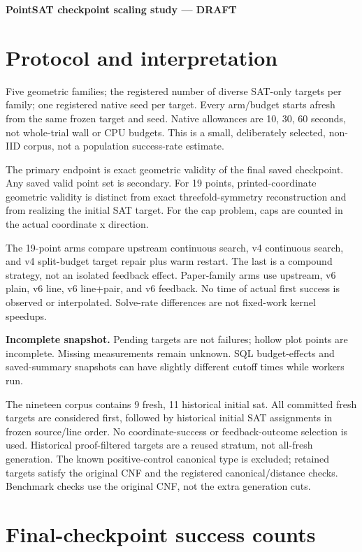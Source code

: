 \documentclass[10pt,a4paper]{article}
\begin{document}
\begin{center}{\Large\bfseries PointSAT checkpoint scaling study --- DRAFT}\end{center}

\section*{Protocol and interpretation}

Five geometric families; the registered number of diverse SAT-only targets per family; one registered native seed per target. Every arm/budget starts afresh from the same frozen target and seed. Native allowances are 10, 30, 60 seconds, not whole-trial wall or CPU budgets. This is a small, deliberately selected, non-IID corpus, not a population success-rate estimate.

The primary endpoint is exact geometric validity of the final saved checkpoint. Any saved valid point set is secondary. For 19 points, printed-coordinate geometric validity is distinct from exact threefold-symmetry reconstruction and from realizing the initial SAT target. For the cap problem, caps are counted in the actual coordinate x direction.

The 19-point arms compare upstream continuous search, v4 continuous search, and v4 split-budget target repair plus warm restart. The last is a compound strategy, not an isolated feedback effect. Paper-family arms use upstream, v6 plain, v6 line, v6 line+pair, and v6 feedback. No time of actual first success is observed or interpolated. Solve-rate differences are not fixed-work kernel speedups.

\textbf{Incomplete snapshot.} Pending targets are not failures; hollow plot points are incomplete. Missing measurements remain unknown. SQL budget-effects and saved-summary snapshots can have slightly different cutoff times while workers run.

The nineteen corpus contains 9 fresh, 11 historical initial sat. All committed fresh targets are considered first, followed by historical initial SAT assignments in frozen source/line order. No coordinate-success or feedback-outcome selection is used. Historical proof-filtered targets are a reused stratum, not all-fresh generation. The known positive-control canonical type is excluded; retained targets satisfy the original CNF and the registered canonical/distance checks. Benchmark checks use the original CNF, not the extra generation cuts.

\section*{Final-checkpoint success counts}
\end{document}
